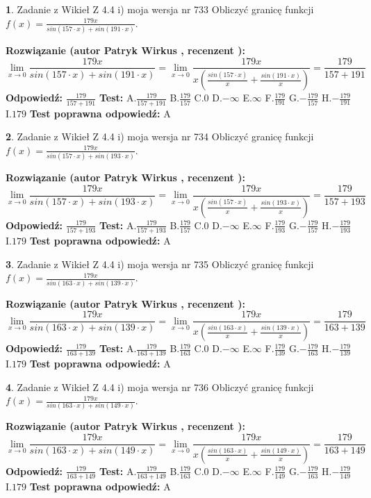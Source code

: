 \documentclass[12pt, a4paper]{article}
\theoremstyle{definition} %
\newtheorem{zad}{}
\newcommand{\zadStart}[1]{\begin{zad}#1\newline}
\newcommand{\zadStop}{\end{zad}}
\newcommand{\rozwStart}[2]{\noindent \textbf{Rozwiązanie (autor #1 , recenzent #2): }\newline}
\newcommand{\rozwStop}{\newline}
\newcommand{\odpStart}{\noindent \textbf{Odpowiedź:}\newline}
\newcommand{\odpStop}{\newline}
\newcommand{\testStart}{\noindent \textbf{Test:}\newline}
\newcommand{\testStop}{\newline}
\newcommand{\kluczStart}{\noindent \textbf{Test poprawna odpowiedź:}\newline}
\newcommand{\kluczStop}{\newline}
\begin{document}
\zadStart{Zadanie z Wikieł Z 4.4 i) moja wersja nr 733}
Obliczyć granicę funkcji $f(x)=\frac{179x}{sin(157\cdot x) +sin(191\cdot x)}$.
\zadStop
\rozwStart{Patryk Wirkus}{}
$$\lim\limits_{x\to 0}\frac{179x}{sin(157\cdot x) +sin(191\cdot x)}=\lim\limits_{x\to 0}\frac{179x}{x(\frac{sin(157\cdot x)}{x}+\frac{sin(191\cdot x)}{x})}=\frac{179}{157+191}$$
\rozwStop
\odpStart
$\frac{179}{157+191}$
\odpStop
\testStart
A.$\frac{179}{157+191}$
B.$\frac{179}{157}$
C.$0$
D.$-\infty$
E.$\infty$
F.$\frac{179}{191}$
G.$-\frac{179}{157}$
H.$-\frac{179}{191}$
I.$179$
\testStop
\kluczStart
A
\kluczStop



\zadStart{Zadanie z Wikieł Z 4.4 i) moja wersja nr 734}
Obliczyć granicę funkcji $f(x)=\frac{179x}{sin(157\cdot x) +sin(193\cdot x)}$.
\zadStop
\rozwStart{Patryk Wirkus}{}
$$\lim\limits_{x\to 0}\frac{179x}{sin(157\cdot x) +sin(193\cdot x)}=\lim\limits_{x\to 0}\frac{179x}{x(\frac{sin(157\cdot x)}{x}+\frac{sin(193\cdot x)}{x})}=\frac{179}{157+193}$$
\rozwStop
\odpStart
$\frac{179}{157+193}$
\odpStop
\testStart
A.$\frac{179}{157+193}$
B.$\frac{179}{157}$
C.$0$
D.$-\infty$
E.$\infty$
F.$\frac{179}{193}$
G.$-\frac{179}{157}$
H.$-\frac{179}{193}$
I.$179$
\testStop
\kluczStart
A
\kluczStop



\zadStart{Zadanie z Wikieł Z 4.4 i) moja wersja nr 735}
Obliczyć granicę funkcji $f(x)=\frac{179x}{sin(163\cdot x) +sin(139\cdot x)}$.
\zadStop
\rozwStart{Patryk Wirkus}{}
$$\lim\limits_{x\to 0}\frac{179x}{sin(163\cdot x) +sin(139\cdot x)}=\lim\limits_{x\to 0}\frac{179x}{x(\frac{sin(163\cdot x)}{x}+\frac{sin(139\cdot x)}{x})}=\frac{179}{163+139}$$
\rozwStop
\odpStart
$\frac{179}{163+139}$
\odpStop
\testStart
A.$\frac{179}{163+139}$
B.$\frac{179}{163}$
C.$0$
D.$-\infty$
E.$\infty$
F.$\frac{179}{139}$
G.$-\frac{179}{163}$
H.$-\frac{179}{139}$
I.$179$
\testStop
\kluczStart
A
\kluczStop



\zadStart{Zadanie z Wikieł Z 4.4 i) moja wersja nr 736}
Obliczyć granicę funkcji $f(x)=\frac{179x}{sin(163\cdot x) +sin(149\cdot x)}$.
\zadStop
\rozwStart{Patryk Wirkus}{}
$$\lim\limits_{x\to 0}\frac{179x}{sin(163\cdot x) +sin(149\cdot x)}=\lim\limits_{x\to 0}\frac{179x}{x(\frac{sin(163\cdot x)}{x}+\frac{sin(149\cdot x)}{x})}=\frac{179}{163+149}$$
\rozwStop
\odpStart
$\frac{179}{163+149}$
\odpStop
\testStart
A.$\frac{179}{163+149}$
B.$\frac{179}{163}$
C.$0$
D.$-\infty$
E.$\infty$
F.$\frac{179}{149}$
G.$-\frac{179}{163}$
H.$-\frac{179}{149}$
I.$179$
\testStop
\kluczStart
A
\kluczStop
\end{document}
